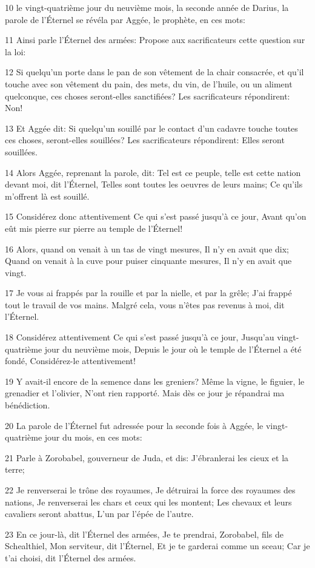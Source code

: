 \par 10 le vingt-quatrième jour du neuvième mois, la seconde année de Darius, la parole de l'Éternel se révéla par Aggée, le prophète, en ces mots:
\par 11 Ainsi parle l'Éternel des armées: Propose aux sacrificateurs cette question sur la loi:
\par 12 Si quelqu'un porte dans le pan de son vêtement de la chair consacrée, et qu'il touche avec son vêtement du pain, des mets, du vin, de l'huile, ou un aliment quelconque, ces choses seront-elles sanctifiées? Les sacrificateurs répondirent: Non!
\par 13 Et Aggée dit: Si quelqu'un souillé par le contact d'un cadavre touche toutes ces choses, seront-elles souillées? Les sacrificateurs répondirent: Elles seront souillées.
\par 14 Alors Aggée, reprenant la parole, dit: Tel est ce peuple, telle est cette nation devant moi, dit l'Éternel, Telles sont toutes les oeuvres de leurs mains; Ce qu'ils m'offrent là est souillé.
\par 15 Considérez donc attentivement Ce qui s'est passé jusqu'à ce jour, Avant qu'on eût mis pierre sur pierre au temple de l'Éternel!
\par 16 Alors, quand on venait à un tas de vingt mesures, Il n'y en avait que dix; Quand on venait à la cuve pour puiser cinquante mesures, Il n'y en avait que vingt.
\par 17 Je vous ai frappés par la rouille et par la nielle, et par la grêle; J'ai frappé tout le travail de vos mains. Malgré cela, vous n'êtes pas revenus à moi, dit l'Éternel.
\par 18 Considérez attentivement Ce qui s'est passé jusqu'à ce jour, Jusqu'au vingt-quatrième jour du neuvième mois, Depuis le jour où le temple de l'Éternel a été fondé, Considérez-le attentivement!
\par 19 Y avait-il encore de la semence dans les greniers? Même la vigne, le figuier, le grenadier et l'olivier, N'ont rien rapporté. Mais dès ce jour je répandrai ma bénédiction.
\par 20 La parole de l'Éternel fut adressée pour la seconde fois à Aggée, le vingt-quatrième jour du mois, en ces mots:
\par 21 Parle à Zorobabel, gouverneur de Juda, et dis: J'ébranlerai les cieux et la terre;
\par 22 Je renverserai le trône des royaumes, Je détruirai la force des royaumes des nations, Je renverserai les chars et ceux qui les montent; Les chevaux et leurs cavaliers seront abattus, L'un par l'épée de l'autre.
\par 23 En ce jour-là, dit l'Éternel des armées, Je te prendrai, Zorobabel, fils de Schealthiel, Mon serviteur, dit l'Éternel, Et je te garderai comme un sceau; Car je t'ai choisi, dit l'Éternel des armées.


